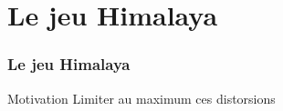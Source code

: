 \section{Le jeu Himalaya}
	\begin{frame}
		\frametitle{Le jeu Himalaya}
		\begin{block}{Motivation}
			Limiter au maximum ces distorsions
		\end{block}	
\end{frame}